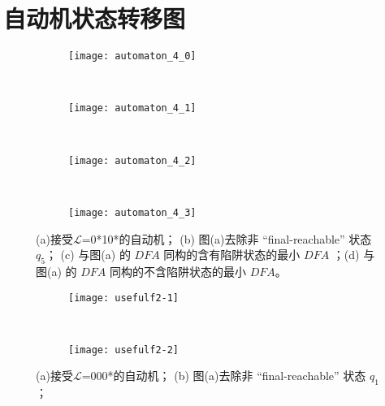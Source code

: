 \chapter{自动机状态转移图}


\begin{figure}[!htbp]
    \centering
    \begin{subfigure}[b]{0.35\textwidth}
        \texttt{[image: automaton\_4\_0]}
        \caption{}
        \label{fig:DFA4_0}
    \end{subfigure}
    ~
    \begin{subfigure}[b]{0.35\textwidth}
        \texttt{[image: automaton\_4\_1]}
        \caption{}
        \label{fig:DFA4_1}
    \end{subfigure}
    \\
    \begin{subfigure}[b]{0.35\textwidth}
        \texttt{[image: automaton\_4\_2]}
        \caption{}
        \label{fig:DFA4_2}
    \end{subfigure}
    ~
    \begin{subfigure}[b]{0.35\textwidth}
        \texttt{[image: automaton\_4\_3]}
        \caption{}
        \label{fig:DFA4_3}
    \end{subfigure}
    \caption{(a)接受{$\mathcal{L}$}=0*10*的自动机{\cite[fig 5-4]{book1}}；  (b) 图(a)去除非 “final-reachable” 状态 {$q_5$}； (c) 与图(a) 的 $DFA$ 同构的含有陷阱状态的最小 $DFA$ ；(d) 与图(a) 的 $DFA$ 同构的不含陷阱状态的最小 $DFA$。}
    \label{fig:DFA4}
\end{figure}


\begin{figure}[!htbp]
  \centering
  \begin{subfigure}[b]{0.35\textwidth}
      \texttt{[image: usefulf2-1]}
      \caption{}
      \label{fig:usefulf2-1}
  \end{subfigure}
  ~
  \begin{subfigure}[b]{0.35\textwidth}
      \texttt{[image: usefulf2-2]}
      \caption{}
      \label{fig:usefulf2-2}
  \end{subfigure}
  \caption{(a)接受{$\mathcal{L}$}=000*的自动机；  (b) 图(a)去除非 “final-reachable” 状态 {$q_1$}； }
  \label{fig:usefulf2-0}
\end{figure}


